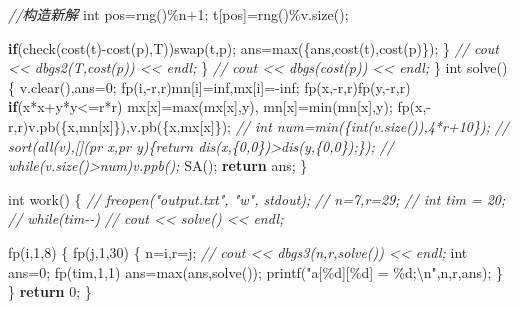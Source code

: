 \documentclass[
]{article}
\newenvironment{Shaded}{}{}
\newcommand{\CommentTok}[1]{\textcolor[rgb]{0.38,0.63,0.69}{\textit{#1}}}
\newcommand{\ControlFlowTok}[1]{\textcolor[rgb]{0.00,0.44,0.13}{\textbf{#1}}}
\newcommand{\DataTypeTok}[1]{\textcolor[rgb]{0.56,0.13,0.00}{#1}}
\newcommand{\DecValTok}[1]{\textcolor[rgb]{0.25,0.63,0.44}{#1}}
\newcommand{\NormalTok}[1]{#1}
\newcommand{\SpecialCharTok}[1]{\textcolor[rgb]{0.25,0.44,0.63}{#1}}
\newcommand{\StringTok}[1]{\textcolor[rgb]{0.25,0.44,0.63}{#1}}
\begin{document}
\begin{Shaded}
\begin{Highlighting}[]
            \CommentTok{//构造新解}
            \DataTypeTok{int}\NormalTok{ pos=rng()\%n+}\DecValTok{1}\NormalTok{; }
\NormalTok{            t[pos]=rng()\%v.size();}

            \ControlFlowTok{if}\NormalTok{(check(cost(t){-}cost(p),T))swap(t,p);}
\NormalTok{            ans=max(\{ans,cost(t),cost(p)\});}
\NormalTok{        \}}
        \CommentTok{// cout \textless{}\textless{} dbgs2(T,cost(p)) \textless{}\textless{} endl;}
\NormalTok{    \}}
    \CommentTok{// cout \textless{}\textless{} dbgs(cost(p)) \textless{}\textless{} endl;}
\NormalTok{\}}
\DataTypeTok{int}\NormalTok{ solve()}
\NormalTok{\{}
\NormalTok{    v.clear(),ans=}\DecValTok{0}\NormalTok{;}
\NormalTok{    fp(i,{-}r,r)mn[i]=inf,mx[i]={-}inf;}
\NormalTok{    fp(x,{-}r,r)fp(y,{-}r,r)}
        \ControlFlowTok{if}\NormalTok{(x*x+y*y\textless{}=r*r)}
\NormalTok{            mx[x]=max(mx[x],y),}
\NormalTok{            mn[x]=min(mn[x],y);}
\NormalTok{    fp(x,{-}r,r)v.pb(\{x,mn[x]\}),v.pb(\{x,mx[x]\});}
    \CommentTok{// int num=min(\{int(v.size()),4*r+10\});}
    \CommentTok{// sort(all(v),[](pr x,pr y)\{return dis(x,\{0,0\})\textgreater{}dis(y,\{0,0\});\});}
    \CommentTok{// while(v.size()\textgreater{}num)v.ppb();}
\NormalTok{    SA();}
    \ControlFlowTok{return}\NormalTok{ ans;}
\NormalTok{\}}

\DataTypeTok{int}\NormalTok{ work()}
\NormalTok{\{}
    \CommentTok{// freopen("output.txt", "w", stdout);}
    \CommentTok{// n=7,r=29; }
    \CommentTok{// int tim = 20;}
    \CommentTok{// while(tim{-}{-})}
        \CommentTok{// cout \textless{}\textless{} solve() \textless{}\textless{} endl;}


\NormalTok{    fp(i,}\DecValTok{1}\NormalTok{,}\DecValTok{8}\NormalTok{)}
\NormalTok{    \{}
\NormalTok{        fp(j,}\DecValTok{1}\NormalTok{,}\DecValTok{30}\NormalTok{)}
\NormalTok{        \{}
\NormalTok{            n=i,r=j;}
            \CommentTok{// cout \textless{}\textless{} dbgs3(n,r,solve()) \textless{}\textless{} endl;}
            \DataTypeTok{int}\NormalTok{ ans=}\DecValTok{0}\NormalTok{;}
\NormalTok{            fp(tim,}\DecValTok{1}\NormalTok{,}\DecValTok{1}\NormalTok{)}
\NormalTok{                ans=max(ans,solve());}
\NormalTok{            printf(}\StringTok{"a[}\SpecialCharTok{\%d}\StringTok{][}\SpecialCharTok{\%d}\StringTok{] = }\SpecialCharTok{\%d}\StringTok{;}\SpecialCharTok{\textbackslash{}n}\StringTok{"}\NormalTok{,n,r,ans);}
\NormalTok{        \}}
\NormalTok{    \}}
    \ControlFlowTok{return} \DecValTok{0}\NormalTok{;}
\NormalTok{\}}
\end{Highlighting}
\end{Shaded}
\end{document}
